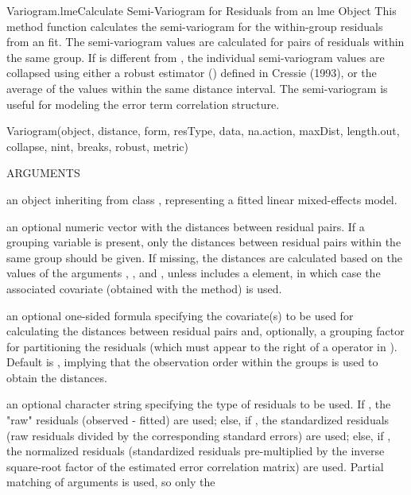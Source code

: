 \documentclass[pdftex]{article} \usepackage{url,graphicx}
\renewcommand{\Twiddle}{\mbox{\(\sim\)}}
\begin{document}
\begin{Helpfile}{Variogram.lme}{Calculate Semi-Variogram for Residuals
    from an lme Object} 
This method function calculates the semi-variogram for the
within-group residuals from an  fit. The semi-variogram
values are calculated for pairs of residuals within the same group. If
 is different from , the individual
semi-variogram values are collapsed using either a robust estimator
() defined in Cressie (1993), or the average of
the values within the same distance interval. The semi-variogram is
useful for modeling the error term correlation structure.
\begin{Example}
Variogram(object, distance, form, resType, data, na.action, maxDist,
          length.out, collapse, nint, breaks, robust, metric)
\end{Example}
\begin{Argument}{ARGUMENTS}
\item[\Co{object:}]
an object inheriting from class , representing
a fitted linear mixed-effects model.
\item[\Co{distance:}]
an optional numeric vector with the distances between
residual pairs. If a grouping variable is present, only the
distances between residual pairs within the same group should be
given. If missing, the distances are calculated based on the
values of the arguments , , and
, unless  includes a 
element, in which case the associated covariate (obtained with the
 method) is used.
\item[\Co{form:}]
an optional one-sided formula specifying the covariate(s)
to be used for calculating the distances between residual pairs and,
optionally, a grouping factor for partitioning the residuals (which
must appear to the right of a \Co{|} operator in
). Default is \Co{{\Twiddle}1}, implying that the observation 
order within the groups is used to obtain the distances.
\item[\Co{resType:}]
an optional character string specifying the type of
residuals to be used. If , the "raw" residuals
(observed - fitted) are used; else, if , the
standardized residuals (raw residuals divided by the corresponding
standard errors) are used; else, if , the
normalized residuals (standardized residuals pre-multiplied by the
inverse square-root factor of the estimated error correlation
matrix) are used. Partial matching of arguments is used, so only the

\end{Argument}
\end{Helpfile}
\end{document}
